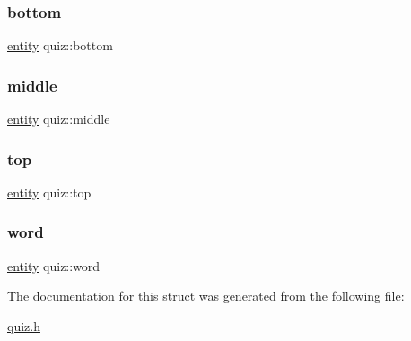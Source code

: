 \subsubsection{\texorpdfstring{bottom}{bottom}}
{\footnotesize\ttfamily \hyperlink{structentity}{entity} quiz\+::bottom}

\mbox{\label{structquiz_a0528acd950fa1ec3b96679a018272f8c}} 
\subsubsection{\texorpdfstring{middle}{middle}}
{\footnotesize\ttfamily \hyperlink{structentity}{entity} quiz\+::middle}

\mbox{\label{structquiz_ad1183ce4a603358f7f9016913219e775}} 
\subsubsection{\texorpdfstring{top}{top}}
{\footnotesize\ttfamily \hyperlink{structentity}{entity} quiz\+::top}

\mbox{\label{structquiz_a1b17d6e71182a599abb2a3b721566738}} 
\subsubsection{\texorpdfstring{word}{word}}
{\footnotesize\ttfamily \hyperlink{structentity}{entity} quiz\+::word}



The documentation for this struct was generated from the following file\+:\begin{DoxyCompactItemize}
\item 
\hyperlink{quiz_8h}{quiz.\+h}\end{DoxyCompactItemize}
